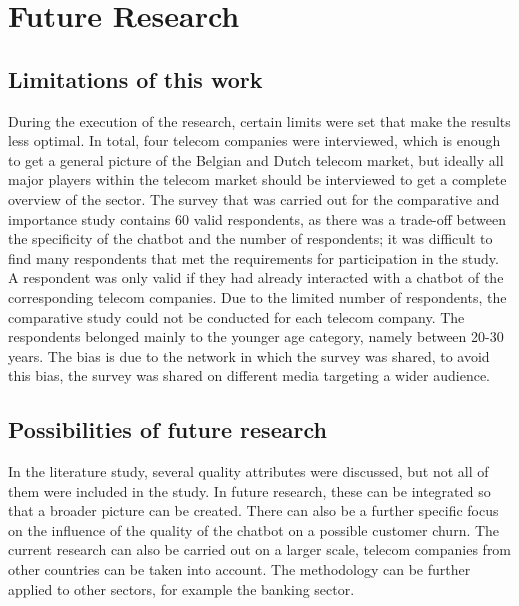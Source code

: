\mainmatter
\pagestyle{headings}
\chapter{Future Research}
\label{ch:futureResearch}

\section{Limitations of this work}
During the execution of the research, certain limits were set that make the results less optimal. In total, four telecom companies were interviewed, which is enough to get a general picture of the Belgian and Dutch telecom market, but ideally all major players within the telecom market should be interviewed to get a complete overview of the sector. The survey that was carried out for the comparative and importance study contains 60 valid respondents, as there was a trade-off between the specificity of the chatbot and the number of respondents; it was difficult to find many respondents that met the requirements for participation in the study. A respondent was only valid if they had already interacted with a chatbot of the corresponding telecom companies. Due to the limited number of respondents, the comparative study could not be conducted for each telecom company. The respondents belonged mainly to the younger age category, namely between 20-30 years. The bias is due to the network in which the survey was shared, to avoid this bias, the survey was shared on different media targeting a wider audience.

\section{Possibilities of future research}
In the literature study, several quality attributes were discussed, but not all of them were included in the study. In future research, these can be integrated so that a broader picture can be created. There can also be a further specific focus on the influence of the quality of the chatbot on a possible customer churn. The current research can also be carried out on a larger scale, telecom companies from other countries can be taken into account. The methodology can be further applied to other sectors, for example the banking sector.